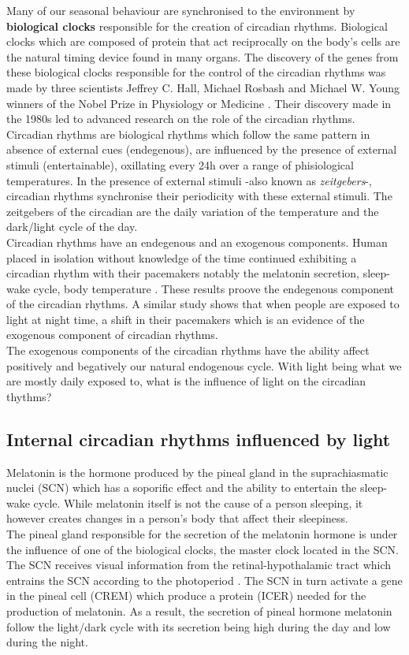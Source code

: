 Many of our seasonal behaviour are synchronised to the environment by \textbf{biological clocks} responsible for the creation of circadian rhythms. Biological clocks which are composed of protein that act reciprocally on the body's cells are the natural timing device found in many organs. The discovery of the genes from these biological clocks responsible for the control of the circadian rhythms was made by three scientists Jeffrey  C.  Hall,  Michael  Rosbash  and Michael W. Young winners of the Nobel Prize in Physiology or Medicine \cite{sc2017}. Their discovery made in the 1980s led to advanced research on the role of the circadian rhythms.\\
Circadian rhythms are biological rhythms which follow the same pattern in absence of external cues (endegenous), are influenced by the presence of external stimuli (entertainable), oxillating every 24h over a range of phisiological temperatures. In the presence of external stimuli -also known as \textit{zeitgebers}-, circadian rhythms synchronise their periodicity with these external stimuli. The zeitgebers of the circadian are the daily variation of the temperature and the dark/light cycle of the day.\\
Circadian rhythms have an endegenous and an exogenous components. Human placed in isolation without knowledge of the time continued exhibiting a circadian rhythm with their pacemakers notably the melatonin secretion, sleep-wake cycle, body temperature \cite{in1996}. These results proove the endegenous component of the circadian rhythms. A similar study shows that when people are exposed to light at night time, a shift in their pacemakers \cite{ea2004} which is an evidence of the exogenous component of circadian rhythms.\\
The exogenous components of the circadian rhythms have the ability affect positively and begatively our natural endogenous cycle. With light being what we are mostly daily exposed to, what is the influence of light on the circadian thythms? 

\subsection{Internal circadian rhythms influenced by light}
Melatonin is the hormone produced by the pineal gland in the suprachiasmatic nuclei (SCN) which has a soporific effect and the ability to entertain the sleep-wake cycle. While melatonin itself is not the cause of a person sleeping, it however creates changes in a person's body that affect their sleepiness. \\
The pineal gland responsible for the secretion of the melatonin hormone is under the influence of one of the biological clocks, the master clock located in the SCN. The SCN receives visual information from the retinal-hypothalamic tract which entrains the SCN according to the photoperiod \cite{lig1994}. The SCN in turn activate a gene in the pineal cell (CREM) which produce a protein (ICER) needed for the production of melatonin. As a result, the secretion of pineal hormone melatonin follow the light/dark cycle with its  secretion being high during the day and low during the night.  

